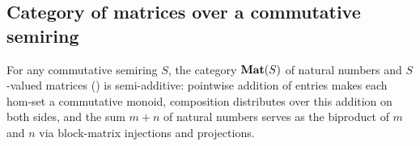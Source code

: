 \subsection{Category of matrices over a commutative semiring}
\label{sec:categories-with-biproducts:mat}

For any commutative semiring $S$, the category $\mathbf{Mat}(S)$ of natural numbers and $S$-valued matrices
() is semi-additive: pointwise addition of entries makes each hom-set a commutative monoid,
composition distributes over this addition on both sides, and the sum $m + n$ of natural numbers serves as
the biproduct of $m$ and $n$ via block-matrix injections and projections.
